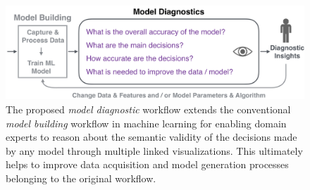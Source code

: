 \begin{figure}[t]
\centering
\includegraphics[width=\textwidth]{figs/workflow_large}
\caption[The model diagnostic workflow.]{
The proposed \textit{model diagnostic} workflow extends the conventional \textit{model building} workflow in machine learning for enabling domain experts to reason about the semantic validity of the decisions made by any model through multiple linked visualizations.
This ultimately helps to improve data acquisition and model generation processes belonging to the original workflow.
}
\label{figs:workflow_intro}
\end{figure}